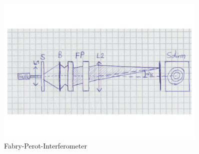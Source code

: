 \documentclass[a4paper,10pt]{scrartcl}
\begin{document}
	\begin{figure}[h]
\centering
\includegraphics[width=0.9\textwidth]{./Bilder/fp1}
\caption{Fabry-Perot-Interferometer}
\end{figure}
\FloatBarrier
	
\end{document}
